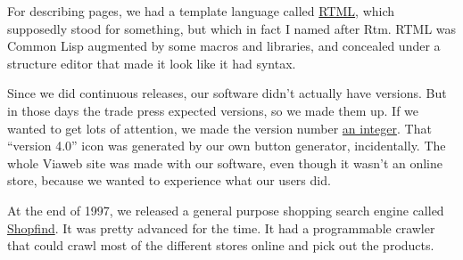 For describing pages, we had a template language called
\href{http://ycombinator.com/viaweb/rtml.html}{RTML}, which supposedly
stood for something, but which in fact I named after Rtm. RTML was
Common Lisp augmented by some macros and libraries, and concealed under
a structure editor that made it look like it had syntax.

Since we did continuous releases, our software didn't actually have
versions. But in those days the trade press expected versions, so we
made them up. If we wanted to get lots of attention, we made the version
number \href{http://www.ycombinator.com/viaweb/rel4.html}{an integer}.
That ``version 4.0'' icon was generated by our own button generator,
incidentally. The whole Viaweb site was made with our software, even
though it wasn't an online store, because we wanted to experience what
our users did.

At the end of 1997, we released a general purpose shopping search engine
called \href{http://ycombinator.com/viaweb/shoprel.html}{Shopfind}. It
was pretty advanced for the time. It had a programmable crawler that
could crawl most of the different stores online and pick out the
products.